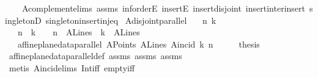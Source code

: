 \begin{isabellebody}
\ \ \ \ A{}complement{\isachardot}{\kern0pt}elims\ assms\ inf{\isachardot}{\kern0pt}orderE\ insertE\ insert{\isacharunderscore}{\kern0pt}disjoint{\isacharparenleft}{\kern0pt}{}{\isacharparenright}{\kern0pt}\ insert{\isacharunderscore}{\kern0pt}inter{\isacharunderscore}{\kern0pt}insert\ singletonD\ singleton{\isacharunderscore}{\kern0pt}insert{\isacharunderscore}{\kern0pt}inj{\isacharunderscore}{\kern0pt}eq{\isacharparenright}{\kern0pt}\isanewline
{}\isamarkupfalse%
%
\endisatagproof
{\isafoldproof}%
%
\isadelimproof
\isanewline
%
\endisadelimproof
\isanewline
{}\isamarkupfalse%
\ A{}disjoint{\isacharunderscore}{\kern0pt}parallel{\isacharcolon}{\kern0pt}\isanewline
\ \ \ n\ k\isanewline
\ \ \ {\isachardoublequoteopen}n\ {\isasyminter}\ k\ {\isacharequal}{\kern0pt}\ {\isacharbraceleft}{\kern0pt}{\isacharbraceright}{\kern0pt}{\isachardoublequoteclose}\ \ {\isachardoublequoteopen}n\ {\isasymin}\ A{}Lines{\isachardoublequoteclose}\ \ {\isachardoublequoteopen}k\ {\isasymin}\ A{}Lines{\isachardoublequoteclose}\isanewline
\ \ \ {\isachardoublequoteopen}affine{\isacharunderscore}{\kern0pt}plane{\isacharunderscore}{\kern0pt}data{\isachardot}{\kern0pt}parallel\ A{}Points\ A{}Lines\ A{}incid\ k\ n{\isachardoublequoteclose}\isanewline
%
\isadelimproof
%
\endisadelimproof
%
\isatagproof
{}\isamarkupfalse%
\ {\isacharminus}{\kern0pt}\isanewline
\ \ \isamarkupfalse%
\ {\isacharquery}{\kern0pt}thesis\isanewline
\ \ \isamarkupfalse%
\ affine{\isacharunderscore}{\kern0pt}plane{\isacharunderscore}{\kern0pt}data{\isachardot}{\kern0pt}parallel{\isacharunderscore}{\kern0pt}def\ assms{\isacharparenleft}{\kern0pt}{}{\isacharparenright}{\kern0pt}\ assms{\isacharparenleft}{\kern0pt}{}{\isacharparenright}{\kern0pt}\ assms{\isacharparenleft}{\kern0pt}{}{\isacharparenright}{\kern0pt}\ \isanewline
\ \ \isamarkupfalse%
\ {\isacharparenleft}{\kern0pt}metis\ A{}incid{\isachardot}{\kern0pt}elims{\isacharparenleft}{\kern0pt}{}{\isacharparenright}{\kern0pt}\ Int{\isacharunderscore}{\kern0pt}iff\ empty{\isacharunderscore}{\kern0pt}iff{\isacharparenright}{\kern0pt}\isanewline
{}\isamarkupfalse%
%
\endisatagproof
{\isafoldproof}%
%
\isadelimproof
\isanewline
%
\endisadelimproof
\isanewline
{}\isamarkupfalse%

\end{isabellebody}

